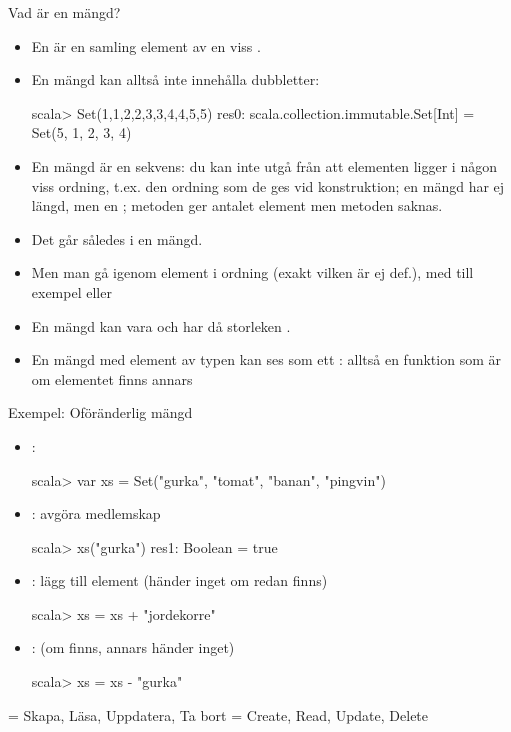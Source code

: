 \begin{Slide}{Vad är en mängd?}\SlideFontSmall
\begin{itemize}
\item En  är en samling  element av en viss .
\item En mängd kan alltså inte innehålla dubbletter:
\begin{REPLnonum}
scala> Set(1,1,2,2,3,3,4,4,5,5)
res0: scala.collection.immutable.Set[Int] =
  Set(5, 1, 2, 3, 4)
\end{REPLnonum}
\pause
\item En mängd är   en sekvens: du kan inte utgå från att elementen ligger i någon viss ordning, t.ex. den ordning som de ges vid konstruktion; en mängd har ej längd, men en ; metoden  ger antalet element men metoden  saknas.
\item Det går således  i en mängd.
\item Men man  gå igenom element i  ordning (exakt vilken är ej def.), med till exempel  eller 
\item En mängd kan vara  och har då storleken .
\pause
\item En mängd  med element av typen  kan ses som ett : alltså en funktion  som är  om elementet finns annars 
\end{itemize}
\end{Slide}


\begin{Slide}{Exempel: Oföränderlig mängd}
\setlength{\leftmargini}{1em}
\begin{itemize}
\item {}:
\begin{REPLnonum}
scala> var xs = Set("gurka", "tomat", "banan", "pingvin")
\end{REPLnonum}

\item {}: avgöra medlemskap
\begin{REPLnonum}
scala> xs("gurka")
res1: Boolean = true
\end{REPLnonum}

\item {}: lägg till element (händer inget om redan finns)
\begin{REPLnonum}
scala> xs = xs + "jordekorre"
\end{REPLnonum}

\item {}: (om finns, annars händer inget)
\begin{REPLnonum}
scala> xs = xs - "gurka"
\end{REPLnonum}
\end{itemize}
{\SlideFontTiny{} = Skapa, Läsa, Uppdatera, Ta bort \hfill{} = Create, Read, Update, Delete}
\end{Slide}


